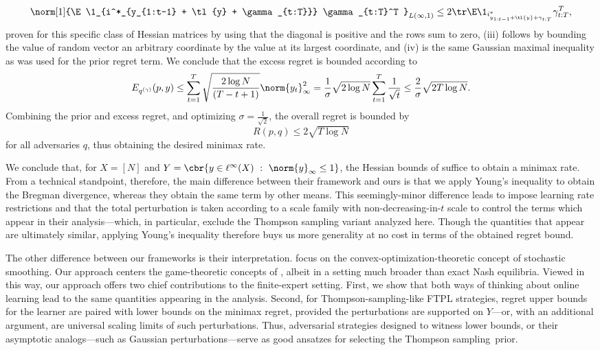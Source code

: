 \documentclass[preprint,12pt]{colt2025}
\begin{document}
\[
\norm[1]{\E \1_{i^*_{y_{1:t-1} + \tl{y} + \gamma_{t:T}}} \gamma_{t:T}^T }_{L(\infty,1)} \leq 2 \tr \E \1_{i^*_{y_{1:t-1} + \tl{y} + \gamma_{t:T}}} \gamma_{t:T}^T,
\] 
proven for this specific class of Hessian matrices by \textcite{abernethy2016perturbation} using that the diagonal is positive and the rows sum to zero, (iii) follows by bounding the value of random vector an arbitrary coordinate by the value at its largest coordinate, and (iv) is the same Gaussian maximal inequality as was used for the prior regret term.
We conclude that the excess regret is bounded according to
\[
E_{q^{(\gamma)}}(p,y) \leq \sum_{t=1}^T \sqrt{\frac{2\log N}{(T-t+1)}}\norm{y_t}_\infty^2 = \frac{1}{\sigma}\sqrt{2\log N} \sum_{t=1}^T \frac{1}{\sqrt{t}} \leq \frac{2}{\sigma}\sqrt{2T \log N}
.
\]
Combining the prior and excess regret, and optimizing $\sigma = \frac{1}{\sqrt{2}}$, the overall regret is bounded by
\[
R(p,q)\leq 2\sqrt{T \log N}
\]
for all adversaries $q$, thus obtaining the desired minimax rate.

We conclude that, for $X = [N]$ and $Y = \cbr{y\in \ell^\infty(X) \ : \ \norm{y}_\infty\leq 1}$, the Hessian bounds of \textcite{abernethy2016perturbation} suffice to obtain a minimax rate.
From a technical standpoint, therefore, the main difference between their framework and ours is that we apply Young's inequality to obtain the Bregman divergence, whereas they obtain the same term by other means.
This seemingly-minor difference leads \textcite{abernethy2016perturbation} to impose learning rate restrictions and that the total perturbation is taken according to a scale family with non-decreasing-in-$t$ scale to control the terms which appear in their analysis---which, in particular, exclude the Thompson sampling variant analyzed here.
Though the quantities that appear are ultimately similar, applying Young's inequality therefore buys us more generality at no cost in terms of the obtained regret bound.

The other difference between our frameworks is their interpretation. \textcite{abernethy2016perturbation} focus on the convex-optimization-theoretic concept of stochastic smoothing. 
Our approach centers the game-theoretic concepts of \textcite{gravin2016towards}, albeit in a setting much broader than exact Nash equilibria.
Viewed in this way, our approach offers two chief contributions to the finite-expert setting. 
First, we show that both ways of thinking about online learning lead to the same quantities appearing in the analysis. 
Second, for Thompson-sampling-like FTPL strategies, regret upper bounds for the learner are paired with lower bounds on the minimax regret, provided the perturbations are supported on $Y$---or, with an additional argument, are universal scaling limits of such perturbations.
Thus, adversarial strategies designed to witness lower bounds, or their asymptotic analogs---such as Gaussian perturbations---serve as good ansatzes for selecting the Thompson sampling~prior.
\end{document}

